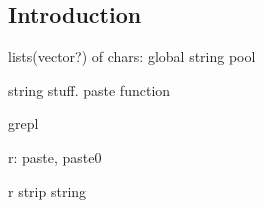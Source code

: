 
\subsection{Introduction}

lists(vector?) of chars: global string pool

string stuff. paste function

grepl

r: paste, paste0

r strip string

